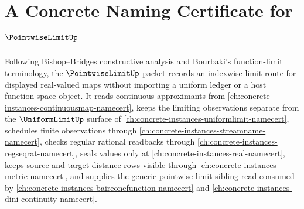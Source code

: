 \chapter{A Concrete Naming Certificate for $\PointwiseLimitUp$}
\label{ch:concrete-instances-pointwise-limit-namecert}

Following Bishop--Bridges constructive analysis and Bourbaki's function-limit terminology, the $\PointwiseLimitUp$ packet records an indexwise limit route for displayed real-valued maps without importing a uniform ledger or a host function-space object. It reads continuous approximants from \autoref{ch:concrete-instances-continuousmap-namecert}, keeps the limiting observations separate from the $\UniformLimitUp$ surface of \autoref{ch:concrete-instances-uniformlimit-namecert}, schedules finite observations through \autoref{ch:concrete-instances-streamname-namecert}, checks regular rational readbacks through \autoref{ch:concrete-instances-regseqrat-namecert}, seals values only at \autoref{ch:concrete-instances-real-namecert}, keeps source and target distance rows visible through \autoref{ch:concrete-instances-metric-namecert}, and supplies the generic pointwise-limit sibling read consumed by \autoref{ch:concrete-instances-baireonefunction-namecert} and \autoref{ch:concrete-instances-dini-continuity-namecert}.

